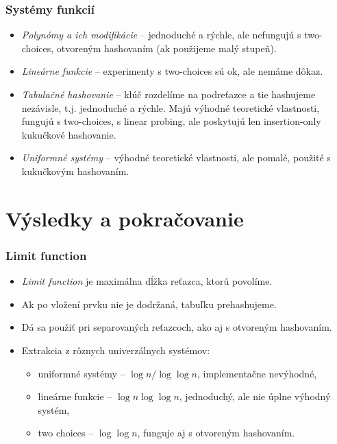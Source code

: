 \begin{frame}	
	\frametitle{Systémy funkcií}
	
	\begin{itemize}
		\item \emph{Polynómy a ich modifikácie} -- jednoduché a rýchle, ale nefungujú s two-choices, otvoreným hashovaním (ak použijeme malý stupeň).
		\item \emph{Lineárne funkcie} -- experimenty s two-choices sú ok, ale nemáme dôkaz.
		\item \emph{Tabulačné hashovanie} -- klúč rozdelíme na podreťazce a tie hashujeme nezávisle, t.j. jednoduché a rýchle. Majú výhodné teoretické vlastnosti, fungujú s two-choices, s linear probing, ale poskytujú len insertion-only kukučkové hashovanie.
		\item \emph{Uniformné systémy} -- výhodné teoretické vlastnosti, ale pomalé, použité s kukučkovým hashovaním.
	\end{itemize}
\end{frame}

\section{Výsledky a pokračovanie}
\begin{frame}
	\frametitle{Limit function}

	\begin{itemize}
		\item \emph{Limit function} je maximálna dĺžka reťazca, ktorú povolíme. 
		\item Ak po vložení prvku nie je dodržaná, tabuľku prehashujeme.
		\item Dá sa použiť pri separovaných reťazcoch, ako aj s otvoreným hashovaním.
		\item Extrakcia z rôznych univerzálnych systémov:
		\begin{itemize}
			\item uniformné systémy -- $\log n / \log \log n$, implementačne nevýhodné, 
			\item lineárne funkcie -- $\log n \log \log n$, jednoduchý, ale nie úplne výhodný systém,
			\item two choices -- $\log \log n$, funguje aj s otvoreným hashovaním.
		\end{itemize}
	\end{itemize}
\end{frame}

